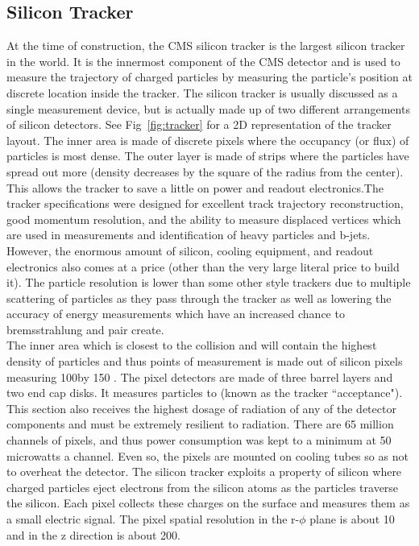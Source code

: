 	\subsection{Silicon Tracker}
	\label{sec:silicon_tracker}
	At the time of construction, the CMS silicon tracker is the largest silicon tracker in the world. It is the innermost component of the CMS detector and is used to measure the trajectory of charged particles by measuring the particle's position at discrete location inside the tracker. The silicon tracker is usually discussed as a single measurement device, but is actually made up of two different arrangements of silicon detectors. See Fig~\ref{fig:tracker} for a 2D representation of the tracker layout. The inner area is made of discrete pixels where the occupancy (or flux) of particles is most dense. The outer layer is made of strips where the particles have spread out more (density decreases by the square of the radius from the center). This allows the tracker to save a little on power and readout electronics.The tracker specifications were designed for excellent track trajectory reconstruction, good momentum resolution, and the ability to measure displaced vertices which are used in measurements and identification of heavy particles and b-jets.  However, the enormous amount of silicon, cooling equipment, and readout electronics also comes at a price (other than the very large literal price to build it). The particle resolution is lower than some other style trackers due to multiple scattering of particles as they pass through the tracker as well as lowering the accuracy of energy measurements which have an increased chance to bremsstrahlung and pair create.\\
	
	 The inner area which is closest to the collision and will contain the highest density of particles and thus points of measurement is made out of silicon pixels measuring 100\um by 150 \um. The pixel detectors are made of three barrel layers and two end cap disks. It measures particles to \abseta {} (known as the tracker ``acceptance"). This section also receives the highest dosage of radiation of any of the detector components and must be extremely resilient to radiation. There are 65 million channels of pixels, and thus power consumption was kept to a minimum at 50 microwatts a channel. Even so, the pixels are mounted on cooling tubes so as not to overheat the detector. The silicon tracker exploits a property of silicon where charged particles eject electrons from the silicon atoms as the particles traverse the silicon. Each pixel collects these charges on the surface and measures them as a small electric signal. The pixel spatial resolution in the r-$\phi$ plane is about 10 \um and in the z direction is about 200\um.\\
	
